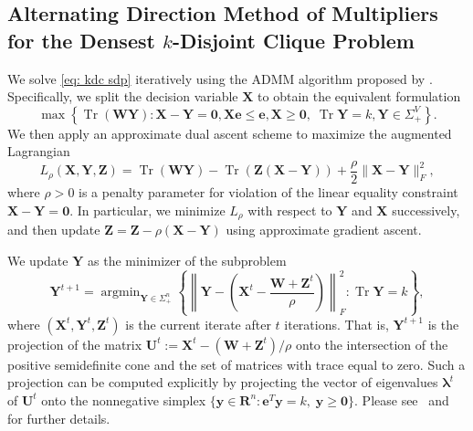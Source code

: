 \documentclass[twoside,11pt]{article}
\newcommand{\R}{\mathbf{R}}
\newcommand{\Z}{\bs{Z}}
\DeclareMathOperator*{\argmin}{\arg\min}
\DeclareMathOperator{\tr}{{Tr}}
\newcommand{\e}{\bs {e}}
\newcommand{\bs}{\boldsymbol}
\newcommand{\X}{\bs {X}}
\newcommand{\y}{\bs {y}}
\newcommand{\Y}{\bs {Y}}
\newcommand{\W}{\bs {W}}
\newcommand{\0}{\bs{0}}
\newcommand{\rbra}[1]{\ensuremath{\left( #1 \right)}} %
\newcommand{\bra}[1]{\ensuremath{\left\{ #1 \right\}}} %
\newcommand{\eq}[1]{\(#1\)}
\begin{document}
{\subsection{Alternating Direction Method of Multipliers for the Densest $k$-Disjoint Clique Problem}
We solve \eqref{eq: kdc sdp} iteratively using the ADMM algorithm proposed by \cite{ames2014guaranteed}.
Specifically, we split the decision variable \eq{\X} to obtain the equivalent formulation
\begin{equation} \label{eq: kdc admm}
\max \bra{ \tr(\W\Y) : \X - \Y = \0, \X\e \le \e, \X \ge \0, \; \tr \Y = k, \Y \in \Sigma^V_+ }.
\end{equation}
We then apply an approximate dual ascent scheme to maximize the augmented Lagrangian
\[
L_\rho(\X,\Y,\Z) = \tr(\W\Y) - \tr(\Z(\X-\Y) ) + \frac{\rho}{2} \| \X - \Y\|^2_F,
\]
where \(\rho > 0\) is a penalty parameter for violation of the linear equality constraint  \(\X-\Y = \0\).
In particular, we minimize \(L_\rho\) with respect to \(\Y\) and \(\X\) successively, and then update
\(\Z = \Z - \rho(\X-\Y)\) using approximate gradient ascent.

We update $\Y$ as the minimizer of the subproblem
\begin{equation}\label{eq: Y subprob}
	\Y^{t+1} = \argmin_{\Y \in \Sigma^n_+} \bra{  \left\| \Y - \rbra{ \X^t - \frac{\W + \Z^t}{\rho}}\right\|^2_F : \tr \Y = k},
\end{equation}
where $(\X^t, \Y^t, \Z^t)$ is the current iterate after $t$ iterations.
That is, $\Y^{t+1}$ is the projection of the matrix $\bs{U}^t := \X^t - (\W + \Z^t)/\rho$ onto the intersection of the positive semidefinite cone and the set of matrices with trace equal to zero.
Such a projection can be computed explicitly by projecting the vector of eigenvalues $\bs{\lambda}^t$ of $\bs{U}^t$ onto the nonnegative simplex $\{\y \in \R^n: \e^T \y = k, \; \y \ge \bs 0\}$.
Please see~\citet[Proposition~2.6] {zhang2011penalty} and \citet{van2008probing} for further details.

}
\end{document}
